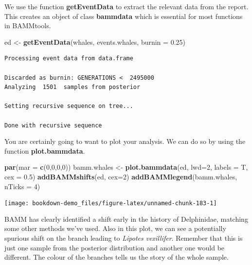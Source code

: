\documentclass[
]{book}
\newenvironment{Shaded}{\begin{snugshade}}{\end{snugshade}}
\newcommand{\DataTypeTok}[1]{\textcolor[rgb]{0.13,0.29,0.53}{#1}}
\newcommand{\DecValTok}[1]{\textcolor[rgb]{0.00,0.00,0.81}{#1}}
\newcommand{\FloatTok}[1]{\textcolor[rgb]{0.00,0.00,0.81}{#1}}
\newcommand{\KeywordTok}[1]{\textcolor[rgb]{0.13,0.29,0.53}{\textbf{#1}}}
\newcommand{\NormalTok}[1]{#1}
\newcommand{\StringTok}[1]{\textcolor[rgb]{0.31,0.60,0.02}{#1}}
\begin{document}
We use the function \textbf{getEventData} to extract the relevant data from the report. This creates an object of class \textbf{bammdata} which is essential for most functions in BAMMtools.

\begin{Shaded}
\begin{Highlighting}[]
\NormalTok{ed \textless{}{-}}\StringTok{ }\KeywordTok{getEventData}\NormalTok{(whales, events.whales, }\DataTypeTok{burnin =} \FloatTok{0.25}\NormalTok{)}
\end{Highlighting}
\end{Shaded}

\begin{verbatim}
Processing event data from data.frame

Discarded as burnin: GENERATIONS <  2495000
Analyzing  1501  samples from posterior

Setting recursive sequence on tree...

Done with recursive sequence
\end{verbatim}

You are certainly going to want to plot your analysis. We can do so by using the function \textbf{plot.bammdata}.

\begin{Shaded}
\begin{Highlighting}[]
\KeywordTok{par}\NormalTok{(}\DataTypeTok{mar =} \KeywordTok{c}\NormalTok{(}\DecValTok{0}\NormalTok{,}\DecValTok{0}\NormalTok{,}\DecValTok{0}\NormalTok{,}\DecValTok{0}\NormalTok{))}
\NormalTok{bamm.whales \textless{}{-}}\StringTok{ }\KeywordTok{plot.bammdata}\NormalTok{(ed, }\DataTypeTok{lwd=}\DecValTok{2}\NormalTok{, }\DataTypeTok{labels =}\NormalTok{ T, }\DataTypeTok{cex =} \FloatTok{0.5}\NormalTok{)}
\KeywordTok{addBAMMshifts}\NormalTok{(ed, }\DataTypeTok{cex=}\DecValTok{2}\NormalTok{)}
\KeywordTok{addBAMMlegend}\NormalTok{(bamm.whales, }\DataTypeTok{nTicks =} \DecValTok{4}\NormalTok{)}
\end{Highlighting}
\end{Shaded}

\begin{center}\texttt{[image: bookdown-demo\_files/figure-latex/unnamed-chunk-183-1]} \end{center}

BAMM has clearly identified a shift early in the history of Delphinidae, matching some other methods we've used. Also in this plot, we can see a potentially spurious shift on the branch leading to \emph{Lipotes vexillifer}. Remember that this is just one sample from the posterior distribution and another one would be different. The colour of the branches tells us the story of the whole sample.
\end{document}

